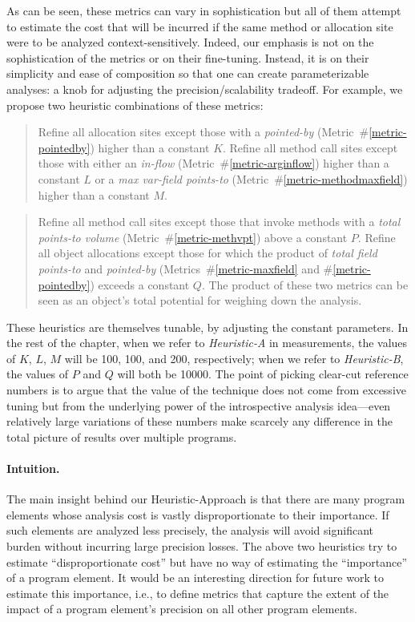 As can be seen, these metrics can vary in sophistication but all of them attempt to estimate the cost that will be incurred if the same method or allocation site were to be analyzed context-sensitively. Indeed, our emphasis is not on the sophistication of the metrics or on their fine-tuning. Instead, it is on their simplicity and ease of composition so that one can create parameterizable analyses: a knob for adjusting the precision/scalability tradeoff. For example, we propose two heuristic combinations of these metrics:

\begin{quote}
Refine all allocation sites except those with a \emph{pointed-by} (Metric~\#\ref{metric-pointedby}) higher than a constant $K$.  Refine all method call sites except those with either an \emph{in-flow} (Metric~\#\ref{metric-arginflow}) higher than a constant $L$ or a \emph{max var-field points-to} (Metric~\#\ref{metric-methodmaxfield}) higher than a constant $M$.
\end{quote}

\begin{quote}
Refine all method call sites except those that invoke methods with a \emph{total points-to volume} (Metric~\#\ref{metric-methvpt}) above a constant $P$. Refine all object allocations except those for which the product of \emph{total field points-to} and \emph{pointed-by} (Metrics~\#\ref{metric-maxfield} and \#\ref{metric-pointedby}) exceeds a constant $Q$. The product of these two metrics can be seen as an object's total potential for weighing down the analysis.
\end{quote}

These heuristics are themselves tunable, by adjusting the constant parameters. In the rest of the chapter, when we refer to \emph{Heuristic-A} in measurements, the values of $K$, $L$, $M$ will be 100, 100, and 200, respectively; when we refer to \emph{Heuristic-B}, the values of $P$ and $Q$ will both be 10000. The point of picking clear-cut reference numbers is to argue that the value of the technique does not come from excessive tuning but from the underlying power of the introspective analysis idea---even relatively large variations of these numbers make scarcely any difference in the total picture of results over multiple programs.

\paragraph*{Intuition.} 
The main insight behind our Heuristic-Approach is that there are many program elements whose analysis cost is vastly disproportionate to their importance. If such elements are analyzed less precisely, the analysis will avoid significant burden without incurring large precision losses. The above two heuristics try to estimate ``disproportionate cost'' but have no way of estimating the ``importance'' of a program element. It would be an interesting direction for future work to estimate this importance, i.e., to define metrics that capture the extent of the impact of a program element's precision on all other program elements.

